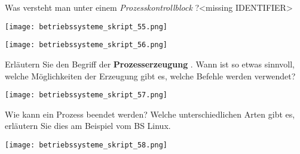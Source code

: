 \documentclass{article}
\begin{document}
\begin{tcolorbox}[colback=white!10!white,colframe=lightgray!75!black,
  savelowerto=\jobname_ex.tex,breakable,enhanced,lines before break=40]

\begin{center}
Was versteht man unter einem 
\textit{Prozesskontrollblock
}?<missing IDENTIFIER>

\end{center}

\tcblower

\justifying
\begin{center}
\texttt{[image: betriebssysteme\_skript\_55.png]}
\end{center}
\begin{center}
\texttt{[image: betriebssysteme\_skript\_56.png]}
\end{center}

\end{tcolorbox}
\begin{tcolorbox}[colback=white!10!white,colframe=lightgray!75!black,
  savelowerto=\jobname_ex.tex,breakable,enhanced,lines before break=40]

\begin{center}
Erläutern Sie den Begriff der 
\textbf{Prozesserzeugung
}. 
Wann ist so etwas sinnvoll, welche Möglichkeiten der Erzeugung gibt es, welche Befehle werden verwendet?

\end{center}

\tcblower

\justifying
\begin{center}
\texttt{[image: betriebssysteme\_skript\_57.png]}
\end{center}

\end{tcolorbox}
\begin{tcolorbox}[colback=white!10!white,colframe=lightgray!75!black,
  savelowerto=\jobname_ex.tex,breakable,enhanced,lines before break=40]

\begin{center}
Wie kann ein Prozess beendet werden?
Welche unterschiedlichen Arten gibt es, erläutern Sie dies am Beispiel vom BS Linux.

\end{center}

\tcblower

\justifying
\begin{center}
\texttt{[image: betriebssysteme\_skript\_58.png]}
\end{center}

\end{tcolorbox}
\end{document}
